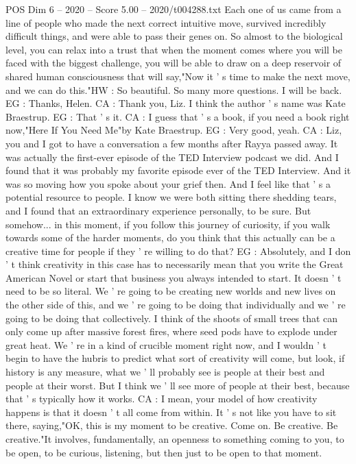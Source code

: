 \begin{textsample}{POS Dim 6 – 2020 – Score 5.00 – 2020/t004288.txt}
Each one of us came from a line of people who made the next correct intuitive move, survived incredibly difficult things, and were able to pass their genes on.
So almost to the biological level, you can relax into a trust that when the moment comes where you will be faced with the biggest challenge, you will be able to draw on a deep reservoir of shared human consciousness that will say,"Now it ' s time to make the next move, and we can do this."HW : So beautiful.
So many more questions.
I will be back.
EG : Thanks, Helen.
CA : Thank you, Liz.
I think the author ' s name was Kate Braestrup.
EG : That ' s it.
CA : I guess that ' s a book, if you need a book right now,"Here If You Need Me"by Kate Braestrup.
EG : Very good, yeah.
CA : Liz, you and I got to have a conversation a few months after Rayya passed away.
It was actually the first-ever episode of the TED Interview podcast we did.
And I found that it was probably my favorite episode ever of the TED Interview.
And it was so moving how you spoke about your grief then.
And I feel like that ' s a potential resource to people.
I know we were both sitting there shedding tears, and I found that an extraordinary experience personally, to be sure.
But somehow... in this moment, if you follow this journey of curiosity, if you walk towards some of the harder moments, do you think that this actually can be a creative time for people if they ' re willing to do that?
EG : Absolutely, and I don ' t think creativity in this case has to necessarily mean that you write the Great American Novel or start that business you always intended to start.
It doesn ' t need to be so literal.
We ' re going to be creating new worlds and new lives on the other side of this, and we ' re going to be doing that individually and we ' re going to be doing that collectively.
I think of the shoots of small trees that can only come up after massive forest fires, where seed pods have to explode under great heat.
We ' re in a kind of crucible moment right now, and I wouldn ' t begin to have the hubris to predict what sort of creativity will come, but look, if history is any measure, what we ' ll probably see is people at their best and people at their worst.
But I think we ' ll see more of people at their best, because that ' s typically how it works.
CA : I mean, your model of how creativity happens is that it doesn ' t all come from within.
It ' s not like you have to sit there, saying,"OK, this is my moment to be creative.
Come on.
Be creative.
Be creative."It involves, fundamentally, an openness to something coming to you, to be open, to be curious, listening, but then just to be open to that moment.

\end{textsample}
